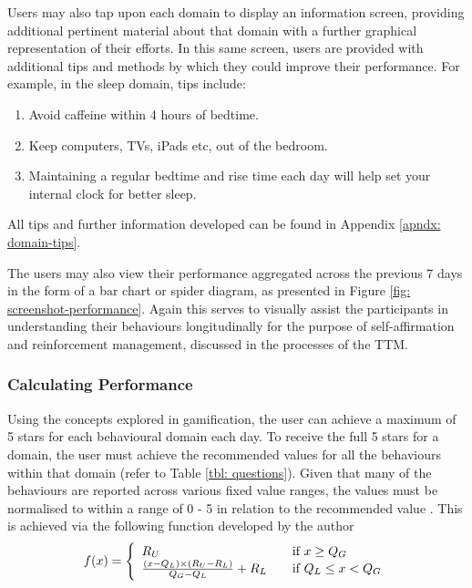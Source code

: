 Users may also tap upon each domain to display an information screen, providing additional pertinent material about that domain with a further graphical representation of their efforts. In this same screen, users are provided with additional tips and methods by which they could improve their performance. For example, in the sleep domain, tips include:
\begin{enumerate}[noitemsep,topsep=0pt]
\item Avoid caffeine within 4 hours of bedtime.
\item Keep computers, TVs, iPads etc, out of the bedroom.
\item Maintaining a regular bedtime and rise time each day will help set your internal clock for better sleep.
\end{enumerate}

All tips and further information developed can be found in Appendix \ref{apndx: domain-tips}.

The users may also view their performance aggregated across the previous 7 days in the form of a bar chart or spider diagram, as presented in Figure \ref{fig: screenshot-performance}. Again this serves to visually assist the participants in understanding their behaviours longitudinally for the purpose of self-affirmation and reinforcement management, discussed in the processes of the TTM.

\subsubsection{Calculating Performance} \label{subsubsection-calculating-performance}
Using the concepts explored in gamification, the user can achieve a maximum of 5 stars for each behavioural domain each day. To receive the full 5 stars for a domain, the user must achieve the recommended values for all the behaviours within that domain (refer to Table \ref{tbl: questions}). Given that many of the behaviours are reported across various fixed value ranges, the values must be normalised to within a range of 0 - 5 in relation to the recommended value \cite{Hartin2014-IWAAL}. This is achieved via the following function developed by the author
\begin{equation}
f(x) = \left\{
         \begin{array}{l l}

         R_{U} & \quad
           \text{if }{x \geq Q_{G} }\\

           \frac{
           \left(x-Q_{L}\right)\times\left(R_{U}-R_{L}\right)}
           {Q_{G}-Q_{L}}
           + R_{L} & \quad
           \text{if }{Q_{L} \leq x < Q_{G}}\\

          \end{array}
          \right.
          \label{eq: calc-performance-stars}
\end{equation}

